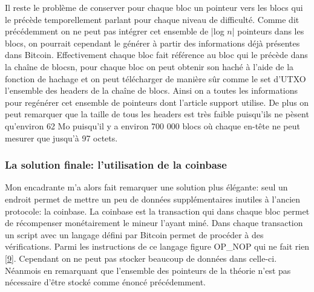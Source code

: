 \documentclass[12pt,a4paper]{article}
\newcommand{\source}[1]{\hyperlink{#1}{[#1]}}
\begin{document}
Il reste le problème de conserver pour chaque bloc un pointeur vers les blocs qui le précède temporellement parlant pour chaque niveau de difficulté. Comme dit précédemment on ne peut pas intégrer cet ensemble de |log $n$| pointeurs dans les blocs, on pourrait cependant le générer à partir des informations déjà présentes dans Bitcoin. Effectivement chaque bloc fait référence au bloc qui le précède dans la chaîne de blocsn, pour chaque bloc on peut obtenir son haché à l'aide de la fonction de hachage et on peut télécharger de manière sûr comme le set d'UTXO l'ensemble des headers de la chaîne de blocs. Ainsi on a toutes les informations pour regénérer cet ensemble de pointeurs dont l'article support utilise. De plus on peut remarquer que la taille de tous les headers est très faible puisqu'ils ne pèsent qu'environ 62 Mo puisqu'il y a environ 700 000 blocs où chaque en-tête ne peut mesurer que jusqu'à 97 octets.\\ %

	\subsubsection{La solution finale: l'utilisation de la coinbase}

	Mon encadrante m'a alors fait remarquer une solution plus élégante: seul un endroit permet de mettre un peu de données supplémentaires inutiles à l'ancien protocole: la coinbase. La coinbase est la transaction qui dans chaque bloc permet de récompenser monétairement le mineur l'ayant miné. Dans chaque transaction un script avec un langage défini par Bitcoin permet de procéder à des vérifications. Parmi les instructions de ce langage figure OP\_NOP qui ne fait rien \source{9}. Cependant on ne peut pas stocker beaucoup de données dans celle-ci. Néanmois en remarquant que l'ensemble des pointeurs de la théorie n'est pas nécessaire d'être stocké comme énoncé précédemment.%
	
\end{document}
